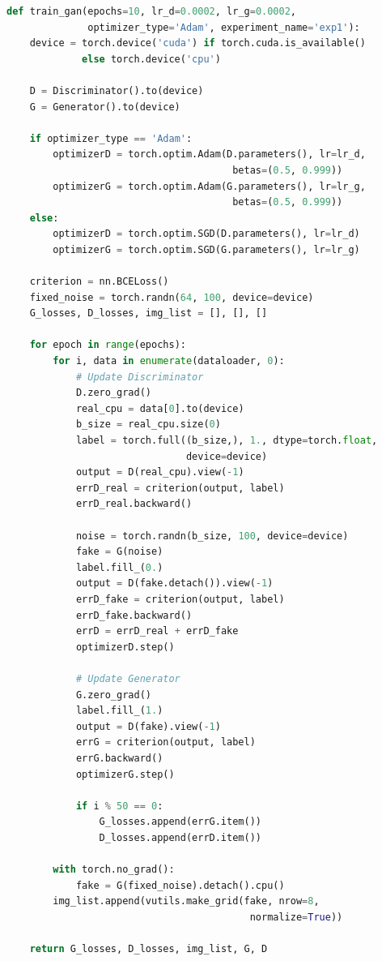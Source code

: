 \documentclass[a4paper]{article}
\begin{document}
\begin{lstlisting}[title=GAN训练函数,frame=trbl,language={Python}]
def train_gan(epochs=10, lr_d=0.0002, lr_g=0.0002,
              optimizer_type='Adam', experiment_name='exp1'):
    device = torch.device('cuda') if torch.cuda.is_available()
             else torch.device('cpu')

    D = Discriminator().to(device)
    G = Generator().to(device)

    if optimizer_type == 'Adam':
        optimizerD = torch.optim.Adam(D.parameters(), lr=lr_d,
                                       betas=(0.5, 0.999))
        optimizerG = torch.optim.Adam(G.parameters(), lr=lr_g,
                                       betas=(0.5, 0.999))
    else:
        optimizerD = torch.optim.SGD(D.parameters(), lr=lr_d)
        optimizerG = torch.optim.SGD(G.parameters(), lr=lr_g)

    criterion = nn.BCELoss()
    fixed_noise = torch.randn(64, 100, device=device)
    G_losses, D_losses, img_list = [], [], []

    for epoch in range(epochs):
        for i, data in enumerate(dataloader, 0):
            # Update Discriminator
            D.zero_grad()
            real_cpu = data[0].to(device)
            b_size = real_cpu.size(0)
            label = torch.full((b_size,), 1., dtype=torch.float,
                               device=device)
            output = D(real_cpu).view(-1)
            errD_real = criterion(output, label)
            errD_real.backward()

            noise = torch.randn(b_size, 100, device=device)
            fake = G(noise)
            label.fill_(0.)
            output = D(fake.detach()).view(-1)
            errD_fake = criterion(output, label)
            errD_fake.backward()
            errD = errD_real + errD_fake
            optimizerD.step()

            # Update Generator
            G.zero_grad()
            label.fill_(1.)
            output = D(fake).view(-1)
            errG = criterion(output, label)
            errG.backward()
            optimizerG.step()

            if i % 50 == 0:
                G_losses.append(errG.item())
                D_losses.append(errD.item())

        with torch.no_grad():
            fake = G(fixed_noise).detach().cpu()
        img_list.append(vutils.make_grid(fake, nrow=8,
                                          normalize=True))

    return G_losses, D_losses, img_list, G, D
\end{lstlisting}
\end{document}
